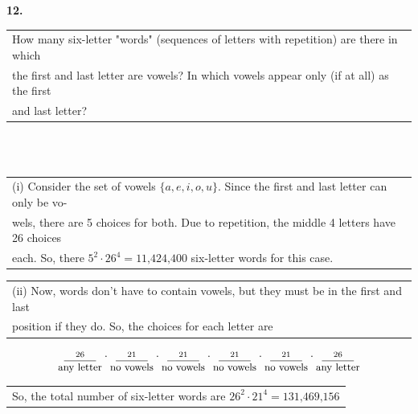 \documentclass[12pt, letterpaper]{article}
\begin{document}
\textbf{12.} \begin{tabular}[t]{l} 
    How many six-letter "words" (sequences of letters with repetition) are there in which \\
    the first and last letter are vowels? In which vowels appear only (if at all) as the first \\
    and last letter?
    \end{tabular} \\ \\
    \indent \indent \begin{tabular}[t]{l}
        (i) Consider the set of vowels $\{a, e, i, o, u\}$. Since the first and last letter can only be vo- \\
        wels, there are 5 choices for both. Due to repetition, the middle 4 letters have 26 choices \\
        each. So, there $5^{2} \cdot 26^{4} = \boxed{\text{11,424,400}}$ six-letter words for this case.
        \end{tabular}
        \indent \indent \begin{tabular}[t]{l}
            (ii) Now, words don't have to contain vowels, but they must be in the first and last \\
            position if they do. So, the choices for each letter are
            \end{tabular}
            \[
                \underset{\text{\small any letter}}{\overset{26}{\underline{\hspace{1cm}}}} \cdot
                \underset{\text{\small no vowels}}{\overset{21}{\underline{\hspace{1cm}}}} \cdot
                \underset{\text{\small no vowels}}{\overset{21}{\underline{\hspace{1cm}}}} \cdot
                \underset{\text{\small no vowels}}{\overset{21}{\underline{\hspace{1cm}}}} \cdot
                \underset{\text{\small no vowels}}{\overset{21}{\underline{\hspace{1cm}}}} \cdot
                \underset{\text{\small any letter}}{\overset{26}{\underline{\hspace{1cm}}}}
            \]
            \indent \indent \indent \begin{tabular}[t]{l}
                So, the total number of six-letter words are $26^{2} \cdot 21^{4} = \boxed{\text{131,469,156}}$
                \end{tabular} \\ \\
\end{document}
